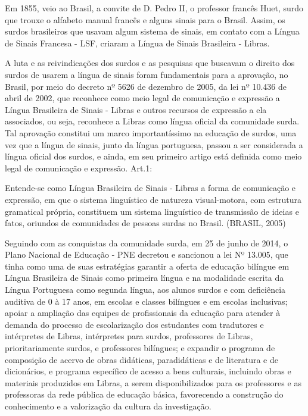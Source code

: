 \documentclass[brasil]{abnt}
\begin{document}
		Em 1855, veio ao Brasil, a convite de D. Pedro II, o professor francês Huet, surdo que trouxe o alfabeto manual francês e alguns sinais para o Brasil. Assim, os surdos brasileiros que 
		usavam algum sistema de sinais, em contato com a Língua de Sinais Francesa - LSF, criaram a Língua de Sinais Brasileira - Libras. 
		
		A luta e as reivindicações dos surdos e as pesquisas que buscavam o direito dos surdos de usarem a língua de sinais foram fundamentais para a aprovação, no Brasil, por meio do decreto nº 5626 de dezembro de 2005,
		da lei nº 10.436 de abril de 2002, que reconhece como meio legal de comunicação e expressão a Língua Brasileira de Sinais - Libras e outros recursos de expressão a ela associados, ou seja, reconhece a Libras 
		como língua oficial da comunidade surda. Tal aprovação constitui um marco importantíssimo na educação de surdos, uma vez que a língua de sinais, junto da língua portuguesa, passou a ser considerada a 
		língua oficial dos surdos, e ainda, em seu primeiro artigo está definida como meio legal de comunicação e expressão. Art.1:
			
				\begin{citacao} Entende-se como Língua Brasileira de Sinais - Libras a forma de comunicação e expressão, em que o sistema linguístico de natureza visual-motora, com estrutura gramatical própria, constituem
								um sistema linguístico de transmissão de ideias e fatos, 
								oriundos de comunidades de pessoas surdas no Brasil. 
								(BRASIL, 2005)
				\end{citacao}
				
		Seguindo com as conquistas da comunidade surda, em 25 de junho de 
		2014, o Plano Nacional de Educação - PNE decretou e sancionou a lei 
		Nº 13.005, que tinha como uma de suas estratégias garantir a
		oferta de educação bilíngue em Língua Brasileira de Sinais 
		como primeira língua e na modalidade escrita da Língua Portuguesa como segunda língua, aos alunos surdos e com deficiência auditiva de 0 à 17 anos, em escolas e classes bilíngues e em escolas 
		inclusivas; apoiar a ampliação das equipes de profissionais da educação para atender à demanda do processo de escolarização dos estudantes com tradutores e intérpretes de Libras, intérpretes para surdos, 
		professores de Libras, prioritariamente surdos, e professores bilíngues; e expandir o programa de composição de acervo de obras didáticas, paradidáticas e de literatura e de dicionários, e programa 
		específico de acesso a bens culturais, incluindo obras e materiais produzidos em Libras, a serem disponibilizados para os professores e as professoras da rede pública de educação básica, favorecendo a 
		construção do conhecimento e a valorização da cultura da investigação.
				
\end{document}
